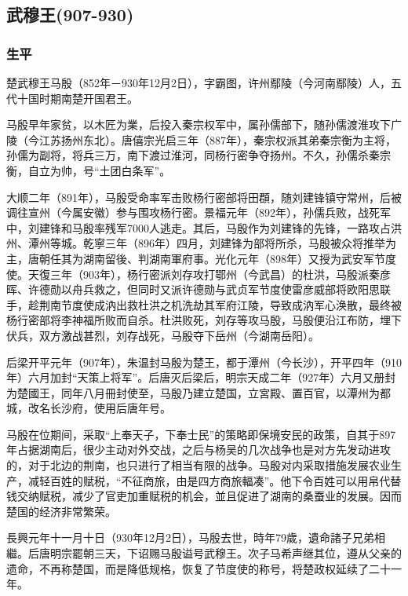 
\subsection{武穆王\tiny(907-930)}

\subsubsection{生平}

楚武穆王马殷（852年－930年12月2日），字霸图，许州鄢陵（今河南鄢陵）人，五代十国时期南楚开国君王。

马殷早年家贫，以木匠为業，后投入秦宗权军中，属孙儒部下，随孙儒渡淮攻下广陵（今江苏扬州东北）。唐僖宗光启三年（887年），秦宗权派其弟秦宗衡为主将，孙儒为副将，将兵三万，南下渡过淮河，同杨行密争夺扬州。不久，孙儒杀秦宗衡，自立为帅，号“土团白条军”。

大顺二年（891年），马殷受命率军击败杨行密部将田頵，随刘建锋镇守常州，后被调往宣州（今属安徽）参与围攻杨行密。景福元年（892年），孙儒兵败，战死军中，刘建锋和马殷率残军7000人逃走。其后，马殷作为刘建锋的先锋，一路攻占洪州、潭州等城。乾寧三年（896年）四月，刘建锋为部将所杀，马殷被众将推举为主，唐朝任其为湖南留後、判湖南軍府事。光化元年（898年）又授为武安军节度使。天復三年（903年），杨行密派刘存攻打鄂州（今武昌）的杜洪，马殷派秦彦晖、许德勋以舟兵救之，但同时又派许德勋与武贞军节度使雷彦威部将欧阳思联手，趁荆南节度使成汭出救杜洪之机洗劫其军府江陵，导致成汭军心涣散，最终被杨行密部将李神福所败而自杀。杜洪败死，刘存等攻马殷，马殷便沿江布防，埋下伏兵，双方激战甚烈，刘存战死，马殷夺下岳州（今湖南岳阳）。

后梁开平元年（907年），朱温封马殷为楚王，都于潭州（今长沙），开平四年（910年）六月加封“天策上将军”。后唐灭后梁后，明宗天成二年（927年）六月又册封为楚國王，同年八月冊封使至，马殷乃建立楚国，立宮殿、置百官，以潭州为都城，改名长沙府，使用后唐年号。

马殷在位期间，采取“上奉天子，下奉士民”的策略即保境安民的政策，自其于897年占据湖南后，很少主动对外交战，之后与杨吴的几次战争也是对方先发动进攻的，对于北边的荆南，也只进行了相当有限的战争。马殷对内采取措施发展农业生产，减轻百姓的赋税，“不征商旅，由是四方商旅輻凑”。他下令百姓可以用帛代替钱交纳赋税，减少了官吏加重赋税的机会，並且促进了湖南的桑蚕业的发展。因而楚国的经济非常繁荣。

長興元年十一月十日（930年12月2日），马殷去世，時年79歲，遺命諸子兄弟相繼。后唐明宗罷朝三天，下诏赐马殷谥号武穆王。次子马希声继其位，遵从父亲的遗命，不再称楚国，而是降低规格，恢复了节度使的称号，将楚政权延续了二十一年。

